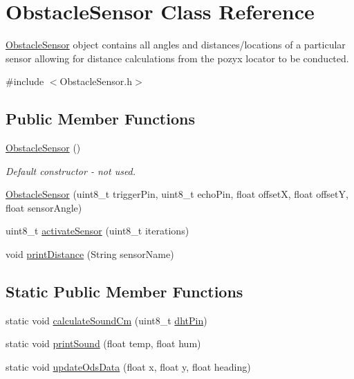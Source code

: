\hypertarget{class_obstacle_sensor}{}\section{Obstacle\+Sensor Class Reference}
\label{class_obstacle_sensor}


\mbox{\hyperlink{class_obstacle_sensor}{Obstacle\+Sensor}} object contains all angles and distances/locations of a particular sensor allowing for distance calculations from the pozyx locator to be conducted.  




{\ttfamily \#include $<$Obstacle\+Sensor.\+h$>$}

\subsection*{Public Member Functions}
\begin{DoxyCompactItemize}
\item 
\mbox{\hyperlink{class_obstacle_sensor_ad1268ce55070472bf5ca463a919d1dd5}{Obstacle\+Sensor}} ()
\begin{DoxyCompactList}\small\item\em Default constructor -\/ not used. \end{DoxyCompactList}\item 
\mbox{\hyperlink{class_obstacle_sensor_ab4d5163bae4a841311d37df28be7872b}{Obstacle\+Sensor}} (uint8\+\_\+t trigger\+Pin, uint8\+\_\+t echo\+Pin, float offsetX, float offsetY, float sensor\+Angle)
\item 
uint8\+\_\+t \mbox{\hyperlink{class_obstacle_sensor_ae451cef8461f01b1672fcf4dd18eb6de}{activate\+Sensor}} (uint8\+\_\+t iterations)
\item 
void \mbox{\hyperlink{class_obstacle_sensor_ad7b512504389e1925d3777f7395ef3ae}{print\+Distance}} (String sensor\+Name)
\end{DoxyCompactItemize}
\subsection*{Static Public Member Functions}
\begin{DoxyCompactItemize}
\item 
static void \mbox{\hyperlink{class_obstacle_sensor_a309eb490fce98867856521dd270f6e97}{calculate\+Sound\+Cm}} (uint8\+\_\+t \mbox{\hyperlink{bot_main_8ino_a89e40ffdf0114ea60292ff57879491e2}{dht\+Pin}})
\item 
static void \mbox{\hyperlink{class_obstacle_sensor_a66ce921e669bb83fa8f23ad2bc2733ee}{print\+Sound}} (float temp, float hum)
\item 
static void \mbox{\hyperlink{class_obstacle_sensor_a15dc53a9c498c7d959178ae903cf7a40}{update\+Ods\+Data}} (float x, float y, float heading)
\end{DoxyCompactItemize}
